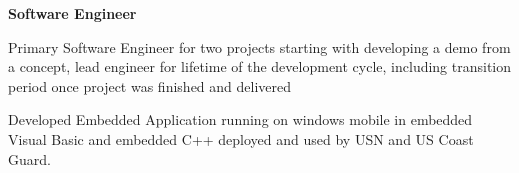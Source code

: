 \documentclass[10pt]{article}
\begin{document}
\begin{outerlist}
\begin{innerlist}
		\item \textbf{Software Engineer}
    \begin{innerlist}%
\item Primary Software Engineer for two projects starting with developing a demo from a concept, lead engineer for lifetime of the development cycle, including transition period once project was finished and delivered
  \item Developed Embedded Application running on windows mobile in embedded Visual Basic and embedded C++ deployed and used by USN and US Coast Guard.
	\end{innerlist}



    
    
%    
\end{innerlist}

\end{outerlist}

\halfblankline
\end{document}
